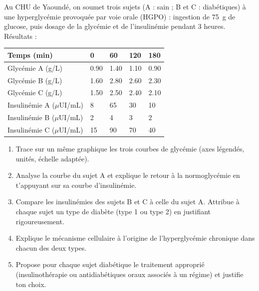 \documentclass[11pt]{article}
\begin{document}
\begin{exercice}
Au CHU de Yaoundé, on soumet trois sujets (A : sain ; B et C : diabétiques) à une hyperglycémie provoquée par voie orale (HGPO) : ingestion de \SI{75}{g} de glucose, puis dosage de la glycémie et de l'insulinémie pendant 3 heures. Résultats :
\begin{center}
\begin{tabularx}{\linewidth}{|l|X|X|X|X|}\hline
\rowcolor{popblueL} Temps (min) & 0 & 60 & 120 & 180 \\ \hline
Glycémie A (g/L) & \num{0,90} & \num{1,40} & \num{1,10} & \num{0,90} \\ \hline
Glycémie B (g/L) & \num{1,60} & \num{2,80} & \num{2,60} & \num{2,30} \\ \hline
Glycémie C (g/L) & \num{1,50} & \num{2,50} & \num{2,40} & \num{2,10} \\ \hline
Insulinémie A ($\mu$UI/mL) & 8 & 65 & 30 & 10 \\ \hline
Insulinémie B ($\mu$UI/mL) & 2 & 4 & 3 & 2 \\ \hline
Insulinémie C ($\mu$UI/mL) & 15 & 90 & 70 & 40 \\ \hline
\end{tabularx}
\end{center}
\begin{enumerate}
\item Trace sur un même graphique les trois courbes de glycémie (axes légendés, unités, échelle adaptée).
\item Analyse la courbe du sujet A et explique le retour à la normoglycémie en t'appuyant sur sa courbe d'insulinémie.
\item Compare les insulinémies des sujets B et C à celle du sujet A. Attribue à chaque sujet un type de diabète (type 1 ou type 2) en justifiant rigoureusement.
\item Explique le mécanisme cellulaire à l'origine de l'hyperglycémie chronique dans chacun des deux types.
\item Propose pour chaque sujet diabétique le traitement approprié (insulinothérapie ou antidiabétiques oraux associés à un régime) et justifie ton choix.
\end{enumerate}
\end{exercice}
\end{document}
